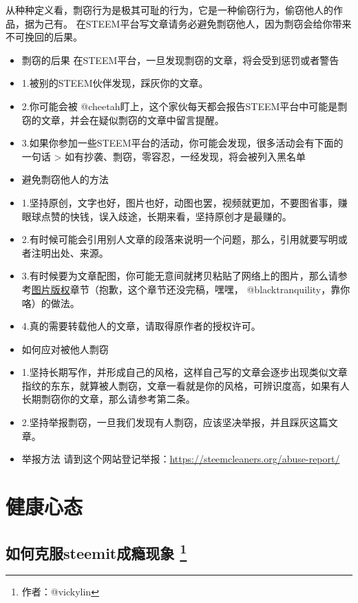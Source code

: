 \documentclass[]{ctexbook}
\begin{document}
从种种定义看，剽窃行为是极其可耻的行为，它是一种偷窃行为，偷窃他人的作品，据为己有。
在STEEM平台写文章请务必避免剽窃他人，因为剽窃会给你带来不可挽回的后果。

\begin{itemize}
\item
  剽窃的后果
  在STEEM平台，一旦发现剽窃的文章，将会受到惩罚或者警告
\item
  1.被别的STEEM伙伴发现，踩灰你的文章。
\item
  2.你可能会被 @cheetah盯上，这个家伙每天都会报告STEEM平台中可能是剽窃的文章，并会在疑似剽窃的文章中留言提醒。
\item
  3.如果你参加一些STEEM平台的活动，你可能会发现，很多活动会有下面的一句话
  \textgreater{} 如有抄袭、剽窃，零容忍，一经发现，将会被列入黑名单
\item
  避免剽窃他人的方法
\item
  1.坚持原创，文字也好，图片也好，动图也罢，视频就更加，不要图省事，赚眼球点赞的快钱，误入歧途，长期来看，坚持原创才是最赚的。
\item
  2.有时候可能会引用别人文章的段落来说明一个问题，那么，引用就要写明或者注明出处、来源。
\item
  3.有时候要为文章配图，你可能无意间就拷贝粘贴了网络上的图片，那么请参考\protect\hyperlink{tpbq}{图片版权}章节（抱歉，这个章节还没完稿，嘿嘿， @blacktranquility，靠你咯）的做法。
\item
  4.真的需要转载他人的文章，请取得原作者的授权许可。
\item
  如何应对被他人剽窃
\item
  1.坚持长期写作，并形成自己的风格，这样自己写的文章会逐步出现类似文章指纹的东东，就算被人剽窃，文章一看就是你的风格，可辨识度高，如果有人长期剽窃你的文章，那么请参考第二条。
\item
  2.坚持举报剽窃，一旦我们发现有人剽窃，应该坚决举报，并且踩灰这篇文章。
\item
  举报方法
  请到这个网站登记举报：\url{https://steemcleaners.org/abuse-report/}
\end{itemize}

\hypertarget{jkxt}{%
\section{健康心态}\label{jkxt}}

\hypertarget{addiction}{%
\subsection[如何克服steemit成瘾现象 ]{\texorpdfstring{如何克服steemit成瘾现象 \footnote{作者：@vickylin}}{如何克服steemit成瘾现象 }}\label{addiction}}
\end{document}
